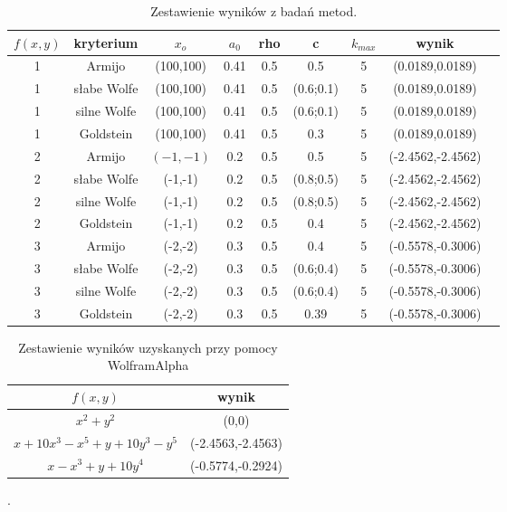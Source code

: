 \documentclass{classrep}
\begin{document}
	\begin{table}[H]
		\begin{center}
\begin{tabular}{|c|c|c|c|c|c|c|c|c}
\hline $f(x,y)$ & kryterium & $x_o$ & $a_0$ & rho & c & $k_{max}$ & wynik\\ 
\hline 1 & Armijo & (100,100) & 0.41 & 0.5 & 0.5 & 5 &  (0.0189,0.0189) \\ 
\hline 1 & słabe Wolfe & (100,100) & 0.41 & 0.5 & (0.6;0.1) & 5 & (0.0189,0.0189) \\
\hline 1 & silne Wolfe & (100,100) & 0.41 & 0.5 & (0.6;0.1) & 5 & (0.0189,0.0189) \\
\hline 1 & Goldstein & (100,100) & 0.41 & 0.5 & 0.3 & 5 & (0.0189,0.0189) \\
\hline 2 & Armijo & $(-1,-1)$ & 0.2 & 0.5 & 0.5 & 5 &(-2.4562,-2.4562) \\ 
\hline 2 & słabe Wolfe & (-1,-1) & 0.2 & 0.5 & (0.8;0.5) & 5 &(-2.4562,-2.4562) \\ 
\hline 2 & silne Wolfe & (-1,-1) & 0.2 & 0.5 & (0.8;0.5) & 5 &(-2.4562,-2.4562) \\ 
\hline 2 & Goldstein & (-1,-1) & 0.2 & 0.5 & 0.4 & 5 &(-2.4562,-2.4562) \\ 
\hline 3 & Armijo & (-2,-2) & 0.3 & 0.5 & 0.4 & 5 & (-0.5578,-0.3006) \\ 
\hline 3 & słabe Wolfe & (-2,-2) & 0.3 & 0.5 & (0.6;0.4) & 5 & (-0.5578,-0.3006) \\ 
\hline 3 & silne Wolfe & (-2,-2) & 0.3 & 0.5 & (0.6;0.4) & 5 & (-0.5578,-0.3006) \\ 
\hline 3 & Goldstein & (-2,-2) & 0.3 & 0.5 & 0.39 & 5 & (-0.5578,-0.3006) \\ 
\hline 
\end{tabular} 

			\caption{Zestawienie wyników z badań metod.}
		\end{center}
	\end{table}
	
	
	\begin{table}[H]
		\begin{center}
\begin{tabular}{|c|c|}
\hline $f(x,y)$ & wynik \\ 
\hline $x^2+y^2$ & (0,0) \\ 
\hline $x+10x^3-x^5 +y+10y^3-y^5$ & (-2.4563,-2.4563) \\ 
\hline $x-x^3 +y+10y^4$ & (-0.5774,-0.2924) \\ 
\hline 
\end{tabular} 
			\caption{Zestawienie wyników uzyskanych przy pomocy WolframAlpha }.
		\end{center}
\end{table}
\end{document}
